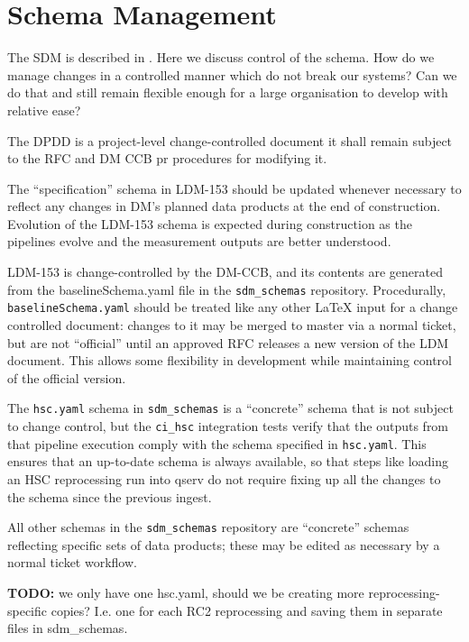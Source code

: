 \section{Schema Management}

The SDM is described in . Here we discuss control of the schema.
How do we manage changes in a controlled manner which do not break our systems?
Can we do that and still remain flexible enough for a large organisation to develop with relative ease?

The DPDD is a project-level change-controlled document it shall remain subject to the RFC and DM CCB pr procedures for modifying it.

The ``specification'' schema in LDM-153 should be updated whenever necessary to reflect any changes
in DM's planned data products at the end of construction. Evolution of the LDM-153 schema is
expected during construction as the pipelines evolve and the measurement outputs are better
understood.

LDM-153 is change-controlled by the DM-CCB, and its contents are generated from the baselineSchema.yaml file
in the \texttt{sdm\_schemas} repository. Procedurally, \texttt{baselineSchema.yaml} should be
treated like any other LaTeX input for a change controlled document: changes to it may be merged to
master via a normal ticket, but are not ``official'' until an approved RFC releases a new version of
the LDM document.  This allows some flexibility in development while maintaining control of the official version.

The \texttt{hsc.yaml} schema in \texttt{sdm\_schemas} is a ``concrete'' schema that is not subject
to change control, but the \texttt{ci\_hsc} integration tests verify that the outputs from that
pipeline execution comply with the schema specified in \texttt{hsc.yaml}. This ensures that an
up-to-date schema is always available, so that steps like loading an HSC reprocessing run into qserv
do not require fixing up all the changes to the schema since the previous ingest.

All other schemas in the \texttt{sdm\_schemas} repository are ``concrete'' schemas reflecting
specific sets of data products; these may be edited as necessary by a normal ticket workflow.

\textbf{TODO:} we only have one hsc.yaml, should we be creating more reprocessing-specific copies?
I.e. one for each RC2 reprocessing and saving them in separate files in sdm\_schemas.

